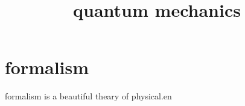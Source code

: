 \documentclass{article}
\begin{document}
\title{quantum mechanics}
\section{formalism}

formalism is a beautiful theary of physical.en
\end{document}
